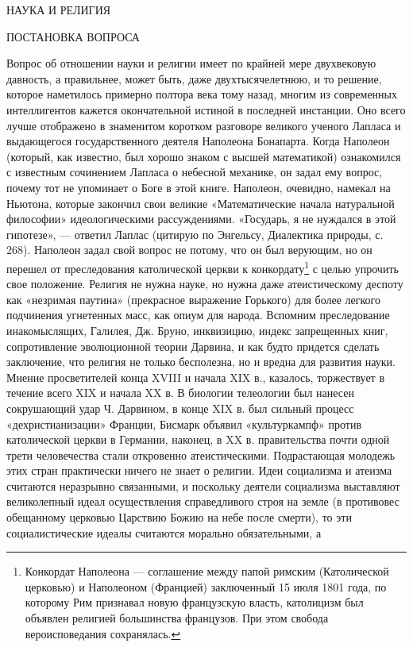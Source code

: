 НАУКА И РЕЛИГИЯ

ПОСТАНОВКА ВОПРОСА

Вопрос об отношении науки и религии имеет по крайней мере двухвековую давность,
а правильнее, может быть, даже двухтысячелетнюю, и то решение, которое
наметилось примерно полтора века тому назад, многим из современных
интеллигентов кажется окончательной истиной в последней инстанции. Оно всего
лучше отображено в знаменитом коротком разговоре великого ученого Лапласа и
выдающегося государственного деятеля Наполеона Бонапарта. Когда Наполеон
(который, как известно, был хорошо знаком с высшей математикой) ознакомился с
известным сочинением Лапласа о небесной механике, он задал ему вопрос, почему
тот не упоминает о Боге в этой книге. Наполеон, очевидно, намекал на Ньютона,
которые закончил свои великие «Математические начала натуральной философии»
идеологическими рассуждениями. «Государь, я не нуждался в этой гипотезе», ---
ответил Лаплас (цитирую по Энгельсу, Диалектика природы, с. 268). Наполеон
задал свой вопрос не потому, что он был верующим, но он перешел от
преследования католической церкви к конкордату\footnote{Конкордат Наполеона ---
соглашение между папой римским (Католической церковью) и Наполеоном
(Францией) заключенный 15 июля 1801 года, по которому Рим признавал
новую французскую власть, католицизм был объявлен религией большинства
французов. При этом свобода вероисповедания сохранялась.} с целью упрочить свое
положение. Религия не нужна науке, но нужна даже атеистическому деспоту как
«незримая паутина» (прекрасное выражение Горького) для более легкого подчинения
угнетенных масс, как опиум для народа. Вспомним преследование инакомыслящих,
Галилея, Дж. Бруно, инквизицию, индекс запрещенных книг, сопротивление
эволюционной теории Дарвина, и как будто придется сделать заключение, что
религия не только бесполезна, но и вредна для развития науки. Мнение
просветителей конца XVIII и начала XIX в., казалось, торжествует в течение
всего XIX и начала XX в. В биологии телеологии был нанесен сокрушающий удар Ч.
Дарвином, в конце XIX в. был сильный процесс «дехристианизации» Франции,
Бисмарк объявил «культуркампф» против католической церкви в Германии, наконец,
в XX в. правительства почти одной трети человечества стали откровенно
атеистическими. Подрастающая молодежь этих стран практически ничего не знает о
религии. Идеи социализма и атеизма считаются неразрывно связанными, и поскольку
деятели социализма выставляют великолепный идеал осуществления справедливого
строя на земле (в противовес обещанному церковью Царствию Божию на небе после
смерти), то эти социалистические идеалы считаются морально обязательными, а
